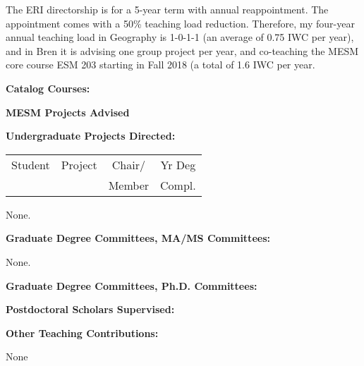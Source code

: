 \documentclass[10pt]{article}
\begin{document}
\begin{enumerate}
{\item The ERI directorship is for a 5-year term with annual reappointment.  The appointment comes with a 50\% teaching load reduction. Therefore, my four-year annual teaching load in Geography is 1-0-1-1 (an average of 0.75 IWC per year), and in Bren it is advising one group project per year, and co-teaching the MESM core course ESM 203 starting in Fall 2018 (a total of 1.6 IWC per year.

}
\end{enumerate}


\vspace{0.5cm}
{\bf Catalog Courses:}


\vspace{0.5cm}
{\bf MESM Projects Advised}


\vspace{1cm}
{\bf Undergraduate Projects Directed:}
{\setlength{\extrarowheight}{3.5pt}
\tablehead{}
\begin{supertabular}{lp{11cm}cc} 
Student & Project & Chair/ & Yr Deg \\
 & & Member & Compl. \\
 \hline
\end{supertabular}
}
None.

\vspace{1cm}
{\bf Graduate Degree Committees, MA/MS Committees:}
\vspace{0.25cm}

None.


\vspace{0.5cm}
{\bf Graduate Degree Committees, Ph.D. Committees:}
\vspace{0.25cm}



\vspace{0.5cm}
{\bf Postdoctoral Scholars Supervised:}


\vspace{0.5cm}
{\bf Other Teaching Contributions:}

None
\end{document}
